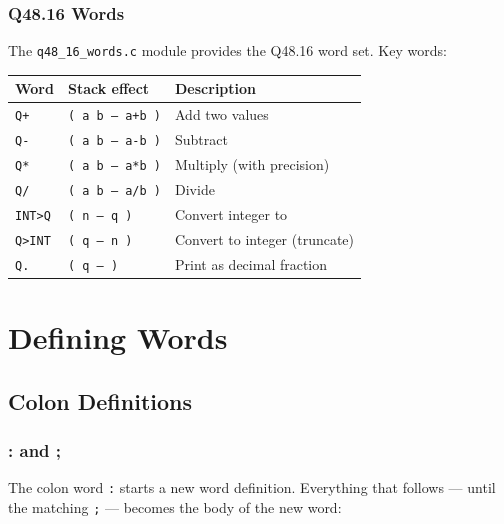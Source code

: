 \section{Q48.16 Words}
\label{sec:q48-words}

The \texttt{q48\_16\_words.c} module provides the Q48.16 word set. Key words:

\begin{center}
\begin{tabular}{lll}
\toprule
Word & Stack effect & Description \\
\midrule
\texttt{Q+}      & \texttt{( a b -- a+b )} & Add two \Qtype{} values \\
\texttt{Q-}      & \texttt{( a b -- a-b )} & Subtract \\
\texttt{Q*}      & \texttt{( a b -- a*b )} & Multiply (with precision) \\
\texttt{Q/}      & \texttt{( a b -- a/b )} & Divide \\
\texttt{INT>Q}   & \texttt{( n -- q )}     & Convert integer to \Qtype{} \\
\texttt{Q>INT}   & \texttt{( q -- n )}     & Convert \Qtype{} to integer (truncate) \\
\texttt{Q.}      & \texttt{( q -- )}       & Print \Qtype{} as decimal fraction \\
\bottomrule
\end{tabular}
\end{center}

\part{Defining Words}

\chapter{Colon Definitions}
\label{chap:colon}

\section{: and ;}
\label{sec:colon-semi}

The colon word \texttt{:} starts a new word definition. Everything that
follows --- until the matching \texttt{;} --- becomes the body of the new
word:

